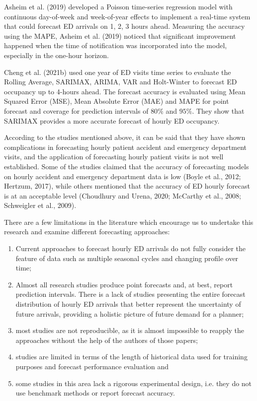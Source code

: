 \documentclass[]{elsarticle} %
\providecommand{\tightlist}{%
  \setlength{\itemsep}{0pt}\setlength{\parskip}{0pt}}
\begin{document}
Asheim et al. (2019) developed a Poisson time-series regression model with
continuous day-of-week and week-of-year effects to implement a real-time
system that could forecast ED arrivals on 1, 2, 3 hours ahead. Measuring
the accuracy using the MAPE, Asheim et al. (2019) noticed that significant
improvement happened when the time of notification was incorporated into
the model, especially in the one-hour horizon.

Cheng et al. (2021b) used one year of ED visits time series to evaluate
the Rolling Average, SARIMAX, ARIMA, VAR and Holt-Winter to forecast ED
occupancy up to 4-hours ahead. The forecast accuracy is evaluated using
Mean Squared Error (MSE), Mean Absolute Error (MAE) and MAPE for point
forecast and coverage for prediction intervals of \(80\%\) and \(95\%\).
They show that SARIMAX provides a more accurate forecast of hourly ED
occupancy.

According to the studies mentioned above, it can be said that they have
shown complications in forecasting hourly patient accident and emergency
department visits, and the application of forecasting hourly patient
visits is not well established. Some of the studies claimed that the
accuracy of forecasting models on hourly accident and emergency
department data is low (Boyle et al., 2012; Hertzum, 2017),
while others mentioned that the accuracy of ED hourly forecast is at an
acceptable level (Choudhury and Urena, 2020; McCarthy et al., 2008; Schweigler et al., 2009).

There are a few limitations in the literature which encourage us to
undertake this research and examine different forecasting approaches:

\begin{enumerate}
\def\labelenumi{(\roman{enumi})}
\tightlist
\item
  Current approaches to forecast hourly ED arrivals do not fully
  consider the feature of data such as multiple seasonal cycles and
  changing profile over time;
\item
  Almost all research studies produce point forecasts and, at best,
  report prediction intervals. There is a lack of studies presenting
  the entire forecast distribution of hourly ED arrivals that better
  represent the uncertainty of future arrivals, providing a holistic
  picture of future demand for a planner;
\item
  most studies are not reproducible, as it is almost impossible to
  reapply the approaches without the help of the authors of those
  papers;
\item
  studies are limited in terms of the length of historical data used
  for training purposes and forecast performance evaluation and
\item
  some studies in this area lack a rigorous experimental design, i.e.
  they do not use benchmark methods or report forecast accuracy.
\end{enumerate}
\end{document}
